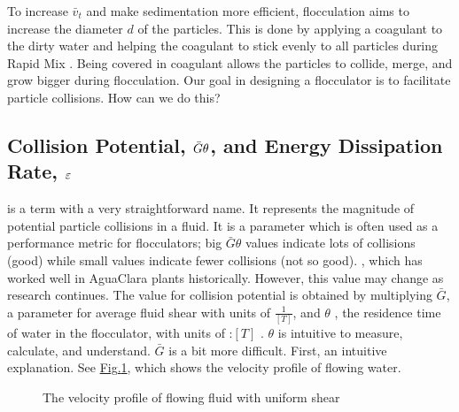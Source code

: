 \documentclass[letterpaper,10pt,english]{sphinxmanual}
\begin{document}
To increase \(\bar v_t\) and make sedimentation more efficient, flocculation aims to increase the diameter \(d\) of the particles. This is done by applying a coagulant to the dirty water and helping the coagulant to stick evenly to all particles during Rapid Mix . Being covered in coagulant allows the particles to collide, merge, and grow bigger during flocculation.
Our goal in designing a flocculator is to facilitate particle collisions. How can we do this?


\subsection{Collision Potential, \protect\(\bar G \theta\protect\), and Energy Dissipation Rate, \protect\(\varepsilon\protect\)}
\label{\detokenize{Flocculation/Floc_Design:collision-potential-and-energy-dissipation-rate}}
 is a term with a very straightforward name. It represents the magnitude of potential particle collisions in a fluid. It is a  parameter which is often used as a performance metric for flocculators; big \(\bar G \theta\) values indicate lots of collisions (good) while small values indicate fewer collisions (not so good). , which has worked well in AguaClara plants historically. However, this value may change as research continues. The value for collision potential is obtained by multiplying \(\bar G\), a parameter for average fluid shear with units of \(\frac{1}{[T]}\), and \(\theta\) , the residence time of water in the flocculator, with units of :\([T]\) . \(\theta\) is intuitive to measure, calculate, and understand. \(\bar G\) is a bit more difficult. First, an intuitive explanation. See \hyperref[\detokenize{Flocculation/Floc_Design:figure-g-velocity-profile}]{Fig.\@ \ref{\detokenize{Flocculation/Floc_Design:figure-g-velocity-profile}}}, which shows the velocity profile of flowing water.

\begin{figure}[htbp]
\centering
\capstart

\noindent{}
\caption{The velocity profile of flowing fluid with uniform shear}\label{\detokenize{Flocculation/Floc_Design:id4}}\label{\detokenize{Flocculation/Floc_Design:figure-g-velocity-profile}}\end{figure}
\end{document}
